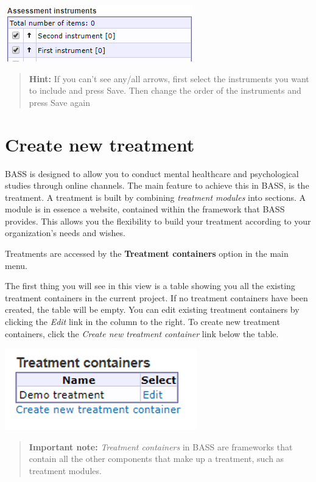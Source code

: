 \documentclass[
]{book}
\begin{document}
\includegraphics{images/assessment-instrument.png}

\begin{quote}
\textbf{Hint:} If you can't see any/all arrows, first select the instruments you want to include and press Save. Then change the order of the instruments and press Save again
\end{quote}

\chapter{Create new treatment}\label{create-new-treatment}

BASS is designed to allow you to conduct mental healthcare and psychological studies through online channels. The main feature to achieve this in BASS, is the treatment.
A treatment is built by combining \emph{treatment modules} into sections. A module is in essence a website, contained within the framework that BASS provides. This allows you the flexibility to build your treatment according to your organization's needs and wishes.

Treatments are accessed by the \textbf{Treatment containers} option in the main menu.

The first thing you will see in this view is a table showing you all the existing treatment containers in the current project. If no treatment containers have been created, the table will be empty.
You can edit existing treatment containers by clicking the \emph{Edit} link in the column to the right.
To create new treatment containers, click the \emph{Create new treatment container} link below the table.

\includegraphics{images/new-images/treatmentContainers.png}

\begin{quote}
\textbf{Important note:} \emph{Treatment containers} in BASS are frameworks that contain all the other components that make up a treatment, such as treatment modules.
\end{quote}
\end{document}
